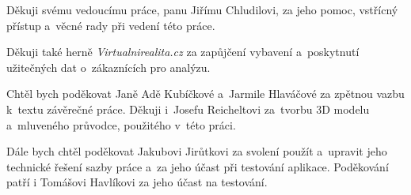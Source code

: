 Děkuji svému vedoucímu práce, panu Jiřímu Chludilovi, za jeho pomoc, vstřícný přístup a~věcné rady při vedení této práce.

Děkuji také herně \emph{Virtualnirealita.cz} za zapůjčení vybavení a~poskytnutí užitečných dat o~zákaznících pro analýzu.

Chtěl bych poděkovat Janě Adě Kubíčkové a~Jarmile Hlaváčové za zpětnou vazbu k~textu závěrečné práce. Děkuji i~Josefu Reicheltovi za~tvorbu 3D modelu a~mluveného průvodce, použitého v~této práci. 

Dále bych chtěl poděkovat Jakubovi Jirůtkovi za svolení použít a~upravit jeho technické řešení sazby práce a~za jeho účast při testování aplikace. Poděkování patří i Tomášovi Havlíkovi za jeho účast na testování.